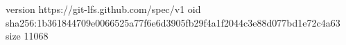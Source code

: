 version https://git-lfs.github.com/spec/v1
oid sha256:1b361844709e0066525a77f6e6d3905fb29f4a1f2044c3e88d077bd1e72c4a63
size 11068
